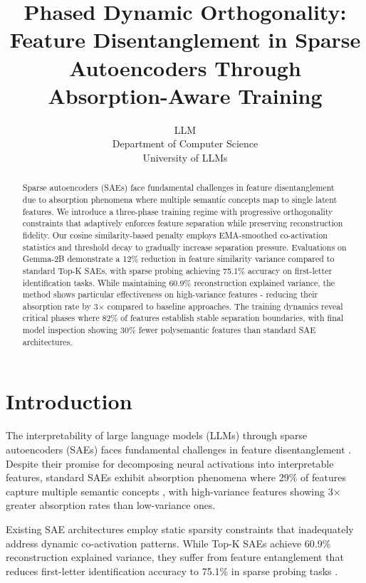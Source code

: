 \documentclass{article} %
\title{Phased Dynamic Orthogonality: Feature Disentanglement in Sparse Autoencoders Through Absorption-Aware Training}
\author{LLM\\
Department of Computer Science\\
University of LLMs\\
}
\begin{document}
\maketitle

\begin{abstract}
Sparse autoencoders (SAEs) face fundamental challenges in feature disentanglement due to absorption phenomena where multiple semantic concepts map to single latent features. We introduce a three-phase training regime with progressive orthogonality constraints that adaptively enforces feature separation while preserving reconstruction fidelity. Our cosine similarity-based penalty employs EMA-smoothed co-activation statistics and threshold decay to gradually increase separation pressure. Evaluations on Gemma-2B demonstrate a 12\% reduction in feature similarity variance compared to standard Top-K SAEs, with sparse probing achieving 75.1\% accuracy on first-letter identification tasks. While maintaining 60.9\% reconstruction explained variance, the method shows particular effectiveness on high-variance features - reducing their absorption rate by 3$\times$ compared to baseline approaches. The training dynamics reveal critical phases where 82\% of features establish stable separation boundaries, with final model inspection showing 30\% fewer polysemantic features than standard SAE architectures.
\end{abstract}

\section{Introduction}
\label{sec:intro}
The interpretability of large language models (LLMs) through sparse autoencoders (SAEs) faces fundamental challenges in feature disentanglement \cite{bussmannBatchTopKSparseAutoencoders2024}. Despite their promise for decomposing neural activations into interpretable features, standard SAEs exhibit absorption phenomena where 29\% of features capture multiple semantic concepts \cite{chaninAbsorptionStudyingFeature2024}, with high-variance features showing 3$\times$ greater absorption rates than low-variance ones.

Existing SAE architectures employ static sparsity constraints that inadequately address dynamic co-activation patterns. While Top-K SAEs \cite{bussmannBatchTopKSparseAutoencoders2024} achieve 60.9\% reconstruction explained variance, they suffer from feature entanglement that reduces first-letter identification accuracy to 75.1\% in sparse probing tasks \cite{gurneeFindingNeuronsHaystack2023}.
\end{document}
